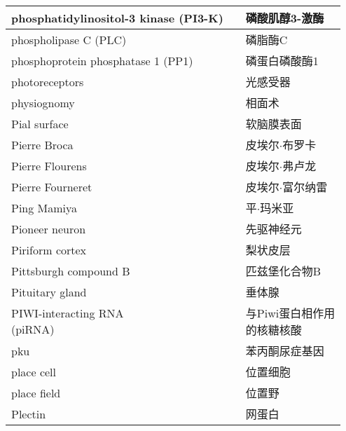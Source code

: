 \begin{longtable}{lll}
	\midrule
	phosphatidylinositol-3 kinase (PI3-K)   && 磷酸肌醇3-激酶   \\
	
	\midrule
	phospholipase C (PLC)     && 磷脂酶C   \\
	
	\midrule
	phosphoprotein phosphatase 1 (PP1)     && 磷蛋白磷酸酶1   \\
	
	\midrule
	photoreceptors     && 光感受器   \\
	
	\midrule
	physiognomy     && 相面术   \\
	
	\midrule
	Pial surface     && 软脑膜表面   \\
	
	\midrule
	Pierre Broca     && 皮埃尔$\cdot$布罗卡   \\
	
	\midrule
	Pierre Flourens     && 皮埃尔$\cdot$弗卢龙   \\
	
	\midrule
	Pierre Fourneret     && 皮埃尔$\cdot$富尔纳雷   \\
	
	\midrule
	Ping Mamiya     && 平$\cdot$玛米亚   \\
	
	\midrule
	Pioneer neuron     && 先驱神经元   \\
	
	\midrule
	Piriform cortex     && 梨状皮层   \\
	
	\midrule
	Pittsburgh compound B     && 匹兹堡化合物B   \\
	
	\midrule
	Pituitary gland     && 垂体腺   \\
	
	\midrule
	\makecell[l]{PIWI-interacting RNA \\ (piRNA) }  && \makecell[l]{与Piwi蛋白相作用\\的核糖核酸}   \\
	
	\midrule
	pku   && 苯丙酮尿症基因   \\
	
	\midrule
	place cell   && 位置细胞   \\
	
	\midrule
	place field   && 位置野   \\
	
	\midrule
	Plectin   && 网蛋白   \\
	

\end{longtable}
